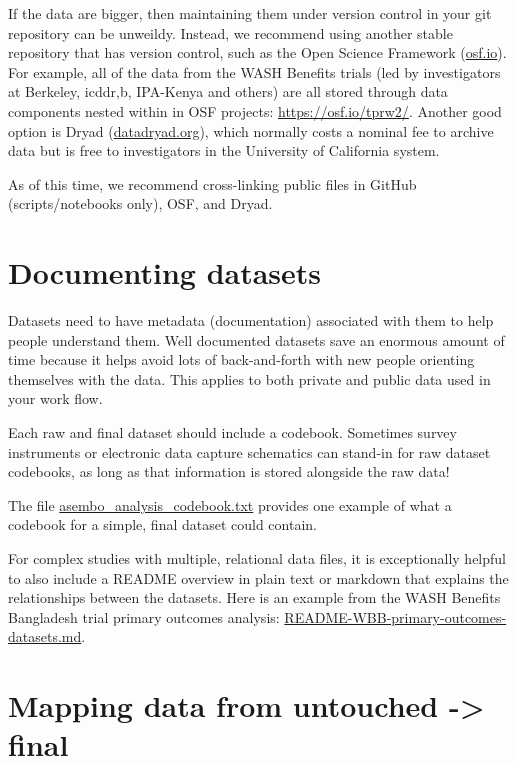 \documentclass[]{book}
\begin{document}
If the data are bigger, then maintaining them under version control in your git repository can be unweildy. Instead, we recommend using another stable repository that has version control, such as the Open Science Framework (\href{https://osf.io}{osf.io}). For example, all of the data from the WASH Benefits trials (led by investigators at Berkeley, icddr,b, IPA-Kenya and others) are all stored through data components nested within in OSF projects: \url{https://osf.io/tprw2/}. Another good option is Dryad (\href{https://datadryad.org/}{datadryad.org}), which normally costs a nominal fee to archive data but is free to investigators in the University of California system.

As of this time, we recommend cross-linking public files in GitHub (scripts/notebooks only), OSF, and Dryad.

\hypertarget{documenting-datasets}{%
\section{Documenting datasets}\label{documenting-datasets}}

Datasets need to have metadata (documentation) associated with them to help people understand them. Well documented datasets save an enormous amount of time because it helps avoid lots of back-and-forth with new people orienting themselves with the data. This applies to both private and public data used in your work flow.

Each raw and final dataset should include a codebook. Sometimes survey instruments or electronic data capture schematics can stand-in for raw dataset codebooks, as long as that information is stored alongside the raw data!

The file \href{https://github.com/ben-arnold/enterics-seroepi/blob/master/data/asembo_analysis_codebook.txt}{asembo\_analysis\_codebook.txt} provides one example of what a codebook for a simple, final dataset could contain.

For complex studies with multiple, relational data files, it is exceptionally helpful to also include a README overview in plain text or markdown that explains the relationships between the datasets. Here is an example from the WASH Benefits Bangladesh trial primary outcomes analysis: \href{https://osf.io/v3nfs/}{README-WBB-primary-outcomes-datasets.md}.

\hypertarget{mapping-data-from-untouched---final}{%
\section{Mapping data from untouched -\textgreater{} final}\label{mapping-data-from-untouched---final}}
\end{document}

